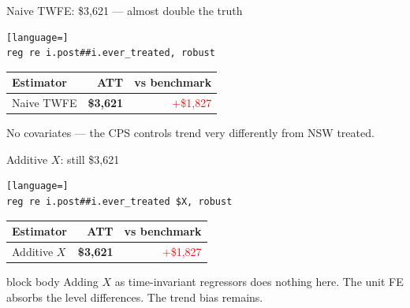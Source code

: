 \documentclass[aspectratio=169,11pt]{beamer}
\newcommand{\emphbox}[1]{%
  \begin{beamercolorbox}[rounded=true,sep=7pt,wd=\linewidth]{block body}%
    \small\color{slate} #1%
  \end{beamercolorbox}}
\begin{document}
\begin{frame}[fragile]{Naive TWFE: \$3,621 --- almost double the truth}
\vspace{0.4em}
\begin{lstlisting}[language=]
reg re i.post##i.ever_treated, robust
\end{lstlisting}
\vspace{0.5em}
\begin{center}
\begin{tabular}{lrr}
\toprule
Estimator & ATT & vs benchmark \\
\midrule
Naive TWFE & \textbf{\$3,621} & \textcolor{red}{$+$\$1,827} \\
\bottomrule
\end{tabular}
\end{center}
\vspace{0.4em}
\begin{center}\color{warmgray}\small
No covariates --- the CPS controls trend very differently from NSW treated.
\end{center}
\end{frame}

\begin{frame}[fragile]{Additive $X$: still \$3,621}
\vspace{0.4em}
\begin{lstlisting}[language=]
reg re i.post##i.ever_treated $X, robust
\end{lstlisting}
\vspace{0.5em}
\begin{center}
\begin{tabular}{lrr}
\toprule
Estimator & ATT & vs benchmark \\
\midrule
Additive $X$ & \textbf{\$3,621} & \textcolor{red}{$+$\$1,827} \\
\bottomrule
\end{tabular}
\end{center}
\vspace{0.4em}
\emphbox{Adding $X$ as time-invariant regressors does nothing here. The unit FE absorbs the level differences. The trend bias remains.}
\end{frame}
\end{document}
